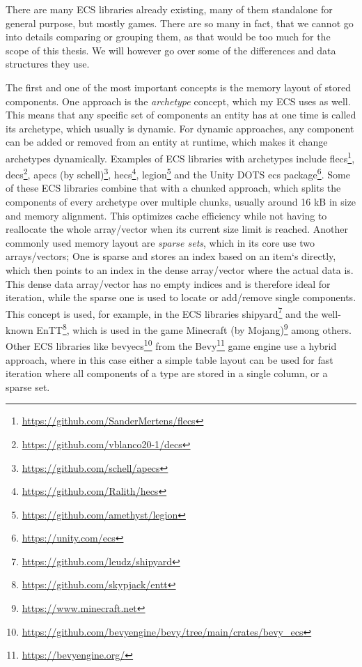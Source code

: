 There are many ECS libraries already existing, many of them standalone for general purpose, but mostly games. There are so many in fact, that we cannot go into details comparing or grouping them, as that would be too much for the scope of this thesis. We will however go over some of the differences and data structures they use.

The first and one of the most important concepts is the memory layout of stored components. One approach is the \textit{archetype} concept, which my ECS uses as well. This means that any specific set of components an entity has at one time is called its archetype, which usually is dynamic. For dynamic approaches, any component can be added or removed from an entity at runtime, which makes it change archetypes dynamically. Examples of ECS libraries with archetypes include \textsf{flecs}\footnote{\url{https://github.com/SanderMertens/flecs}}, \textsf{decs}\footnote{\url{https://github.com/vblanco20-1/decs}}, \textsf{apecs} (by schell)\footnote{\url{https://github.com/schell/apecs}}, \textsf{hecs}\footnote{\url{https://github.com/Ralith/hecs}}, \textsf{legion}\footnote{\url{https://github.com/amethyst/legion}} and the Unity DOTS ecs package\footnote{\url{https://unity.com/ecs}}. Some of these ECS libraries combine that with a chunked approach, which splits the components of every archetype over multiple chunks, usually around 16 kB in size and memory alignment. This optimizes cache efficiency while not having to reallocate the whole array/vector when its current size limit is reached. Another commonly used memory layout are \textit{sparse sets}, which in its core use two arrays/vectors; One is sparse and stores an index based on an item`s directly, which then points to an index in the dense array/vector where the actual data is. This dense data array/vector has no empty indices and is therefore ideal for iteration, while the sparse one is used to locate or add/remove single components. This concept is used, for example, in the ECS libraries \textsf{shipyard}\footnote{\url{https://github.com/leudz/shipyard}} and the well-known \textsf{EnTT}\footnote{\url{https://github.com/skypjack/entt}}, which is used in the game \textsf{Minecraft} (by Mojang)\footnote{\url{https://www.minecraft.net}} among others. Other ECS libraries like \textsf{bevy\textunderscore ecs}\footnote{\url{https://github.com/bevyengine/bevy/tree/main/crates/bevy_ecs}} from the \textsf{Bevy}\footnote{\url{https://bevyengine.org/}} game engine use a hybrid approach, where in this case either a simple table layout can be used for fast iteration where all components of a type are stored in a single column, or a sparse set.

